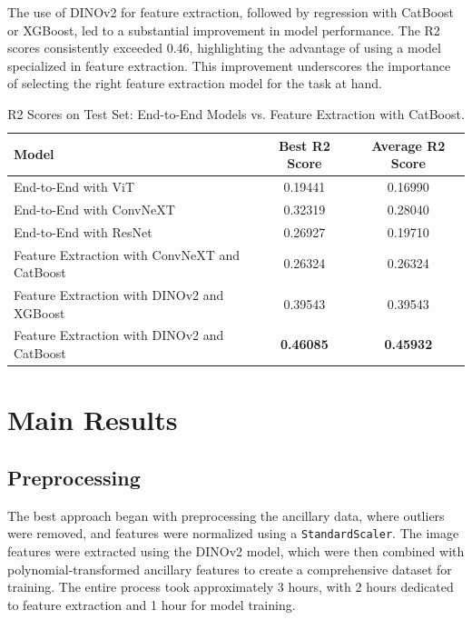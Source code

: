 \documentclass{article}
\begin{document}
The use of DINOv2 for feature extraction, followed by regression with CatBoost or XGBoost, led to a substantial improvement in model performance. The R2 scores consistently exceeded 0.46, highlighting the advantage of using a model specialized in feature extraction. This improvement underscores the importance of selecting the right feature extraction model for the task at hand.

\begin{table}[h]
	\centering
	\caption{R2 Scores on Test Set: End-to-End Models vs. Feature Extraction with CatBoost.}
	\begin{tabular}{lcc}
		\toprule
		Model                                         & Best R2 Score    & Average R2 Score \\
		\midrule
		End-to-End with ViT                           & 0.19441          & 0.16990          \\
		End-to-End with ConvNeXT                      & 0.32319          & 0.28040          \\
		End-to-End with ResNet                        & 0.26927          & 0.19710          \\
		Feature Extraction with ConvNeXT and CatBoost & 0.26324          & 0.26324          \\
		Feature Extraction with DINOv2 and XGBoost    & 0.39543          & 0.39543          \\
		Feature Extraction with DINOv2 and CatBoost   & \textbf{0.46085} & \textbf{0.45932} \\
		\bottomrule
	\end{tabular}
	\label{tab:r2-comparison}
\end{table}


\section{Main Results}
\subsection{Preprocessing}
The best approach began with preprocessing the ancillary data, where outliers were removed, and features were normalized using a \texttt{StandardScaler}. The image features were extracted using the DINOv2 model, which were then combined with polynomial-transformed ancillary features to create a comprehensive dataset for training. The entire process took approximately 3 hours, with 2 hours dedicated to feature extraction and 1 hour for model training.
\end{document}
